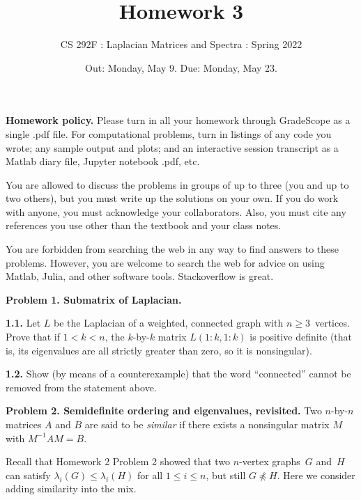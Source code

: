 \documentclass[11pt]{article}
\begin{document}

\title{Homework 3}
\author{CS 292F : Laplacian Matrices and Spectra : Spring 2022}

\date{Out: Monday, May 9. Due: Monday, May 23.}
\maketitle

{\bf Homework policy.} 
Please turn in all your homework through GradeScope as a single .pdf file.
For computational problems, turn in listings of any code you wrote; 
any sample output and plots; and an interactive session transcript as
a Matlab diary file, Jupyter notebook .pdf, etc.

You are allowed to discuss the problems in groups of up to three 
(you and up to two others), but you must write up the solutions 
on your own. If you do work with anyone, you must acknowledge your
collaborators. Also, you must cite any references you use other than
the textbook and your class notes.

You are forbidden from searching the web in any way to find answers
to these problems. However, you are welcome to search the web for
advice on using Matlab, Julia, and other software tools. Stackoverflow
is great.

\par\bigskip
{\bf Problem 1. Submatrix of Laplacian.}

\par\medskip
{\bf 1.1.} 
Let $L$ be the Laplacian of a weighted, connected graph 
with $n\ge 3$~vertices.
Prove that if $1<k<n$, the $k$-by-$k$ matrix $L(1:k,1:k)$ is 
positive definite (that is, its eigenvalues are all strictly greater
than zero, so it is nonsingular).

\par\medskip
{\bf 1.2.} 
Show (by means of a counterexample) that the word ``connected''
cannot be removed from the statement above.

\par\bigskip
{\bf Problem 2. Semidefinite ordering and eigenvalues, revisited.} 
Two $n$-by-$n$ matrices $A$ and $B$ are said to be {\em similar} 
if there exists a nonsingular matrix $M$ with $M^{-1}AM = B$.

Recall that Homework 2 Problem 2 showed that two $n$-vertex
graphs~$G$ and~$H$ can satisfy
$\lambda_i(G)\le\lambda_i(H)$ for all $1\le i\le n$, 
but still $G\not\preceq H$.
Here we consider adding similarity into the mix.
\end{document}
